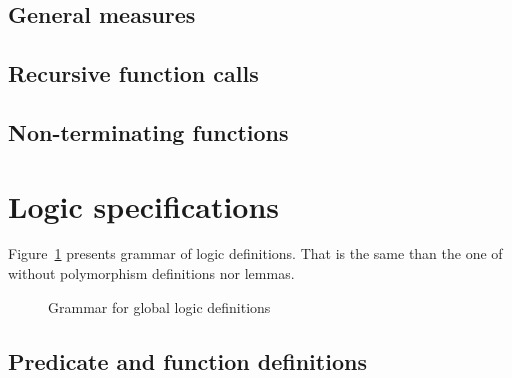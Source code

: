 
\subsection{General measures}
\absent


\subsection{Recursive function calls}
\nodiff


\subsection{Non-terminating functions}
\absent


\section{Logic specifications}
\label{sec:logicspec}


Figure~\ref{fig:gram:logic} presents grammar of logic definitions. That is the
same than the one of \acsl without polymorphism definitions nor lemmas.

\begin{figure}[htbp]
  \caption{Grammar for global logic definitions}
\label{fig:gram:logic}
\end{figure}


\subsection{Predicate and function definitions}
\nodiff

